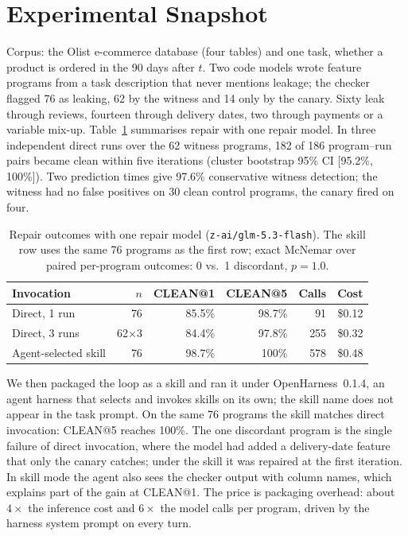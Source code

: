 \documentclass[letterpaper]{article} %
\begin{document}
\section{Experimental Snapshot}

Corpus: the Olist e-commerce database (four tables) and one task, whether
a product is ordered in the 90 days after $t$. Two code models wrote
feature programs from a task description that never mentions leakage; the
checker flagged 76 as leaking, 62 by the witness and 14 only by the canary.
Sixty leak through reviews, fourteen through delivery dates, two through
payments or a variable mix-up. Table~\ref{tab:results}
summarises repair with one repair model. In three independent direct runs
over the 62 witness programs, 182 of 186 program--run pairs became clean
within five iterations (cluster bootstrap 95\% CI [95.2\%, 100\%]). Two
prediction times give 97.6\% conservative witness detection; the witness
had no false positives on 30 clean control programs, the canary fired on
four.

\begin{table}[t]
\centering\footnotesize
\setlength{\tabcolsep}{2pt}
\begin{tabular}{@{}lrrrrr@{}}
\toprule
Invocation & $n$ & CLEAN@1 & CLEAN@5 & Calls & Cost \\
\midrule
Direct, 1 run        & 76          & 85.5\% & 98.7\% & 91  & \$0.12 \\
Direct, 3 runs       & 62$\times$3 & 84.4\% & 97.8\% & 255 & \$0.32 \\
Agent-selected skill & 76          & 98.7\% & 100\%  & 578 & \$0.48 \\
\bottomrule
\end{tabular}
\caption{Repair outcomes with one repair model (\texttt{z-ai/glm-5.3-flash}).
The skill row uses the same 76 programs as the first row; exact McNemar
over paired per-program outcomes: 0 vs.\ 1 discordant, $p = 1.0$.}
\label{tab:results}
\end{table}

We then packaged the loop as a skill and ran it under OpenHarness~0.1.4,
an agent harness that selects and invokes skills on its own; the skill name
does not appear in the task prompt. On the same 76 programs the skill
matches direct invocation: CLEAN@5 reaches 100\%. The one discordant
program is the single failure of direct invocation, where the model had
added a delivery-date feature that only the canary catches; under the skill
it was repaired at the first iteration. In skill mode the agent also sees
the checker output with column names, which explains part of the gain at
CLEAN@1. The price is packaging overhead: about $4\times$ the inference
cost and $6\times$ the model calls per program, driven by the harness
system prompt on every turn.
\end{document}
